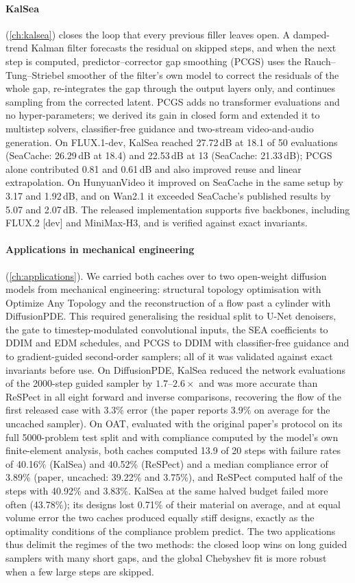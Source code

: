 \paragraph{KalSea} (\cref{ch:kalsea}) closes the loop that every previous filler leaves open. A damped-trend Kalman filter forecasts the residual on skipped steps, and when the next step is computed, predictor--corrector gap smoothing (PCGS) uses the Rauch--Tung--Striebel smoother of the filter's own model to correct the residuals of the whole gap, re-integrates the gap through the output layers only, and continues sampling from the corrected latent. PCGS adds no transformer evaluations and no hyper-parameters; we derived its gain in closed form and extended it to multistep solvers, classifier-free guidance and two-stream video-and-audio generation. On FLUX.1-dev, KalSea reached 27.72\,dB at 18.1 of 50 evaluations (SeaCache: 26.29\,dB at 18.4) and 22.53\,dB at 13 (SeaCache: 21.33\,dB); PCGS alone contributed 0.81 and 0.61\,dB and also improved reuse and linear extrapolation. On HunyuanVideo it improved on SeaCache in the same setup by 3.17 and 1.92\,dB, and on Wan2.1 it exceeded SeaCache's published results by 5.07 and 2.07\,dB. The released implementation supports five backbones, including FLUX.2 [dev] and MiniMax-H3, and is verified against exact invariants.

\paragraph{Applications in mechanical engineering} (\cref{ch:applications}). We carried both caches over to two open-weight diffusion models from mechanical engineering: structural topology optimisation with Optimize Any Topology and the reconstruction of a flow past a cylinder with DiffusionPDE. This required generalising the residual split to U-Net denoisers, the gate to timestep-modulated convolutional inputs, the SEA coefficients to DDIM and EDM schedules, and PCGS to DDIM with classifier-free guidance and to gradient-guided second-order samplers; all of it was validated against exact invariants before use. On DiffusionPDE, KalSea reduced the network evaluations of the 2000-step guided sampler by $1.7$--$2.6\times$ and was more accurate than ReSPect in all eight forward and inverse comparisons, recovering the flow of the first released case with 3.3\% error (the paper reports $3.9\%$ on average for the uncached sampler). On OAT, evaluated with the original paper's protocol on its full 5000-problem test split and with compliance computed by the model's own finite-element analysis, both caches computed 13.9 of 20 steps with failure rates of 40.16\% (KalSea) and 40.52\% (ReSPect) and a median compliance error of 3.89\% (paper, uncached: 39.22\% and 3.75\%), and ReSPect computed half of the steps with 40.92\% and 3.83\%. KalSea at the same halved budget failed more often (43.78\%); its designs lost 0.71\% of their material on average, and at equal volume error the two caches produced equally stiff designs, exactly as the optimality conditions of the compliance problem predict. The two applications thus delimit the regimes of the two methods: the closed loop wins on long guided samplers with many short gaps, and the global Chebyshev fit is more robust when a few large steps are skipped.

